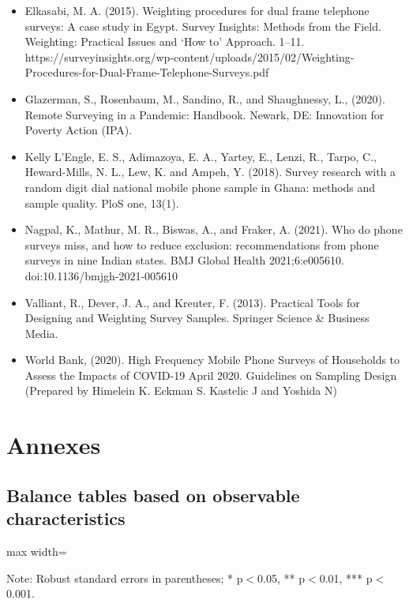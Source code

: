 \documentclass[11pt,harvard]{article}
\begin{document}
\begin{itemize}[left=2.75em]
	\item Elkasabi, M. A. (2015). Weighting procedures for dual frame telephone surveys: A case study in Egypt. Survey Insights: Methods from the Field. Weighting: Practical Issues and ‘How to’ Approach. 1–11. https://surveyinsights.org/wp-content/uploads/2015/02/Weighting-Procedures-for-Dual-Frame-Telephone-Surveys.pdf
	
	\item Glazerman, S., Rosenbaum, M., Sandino, R., and Shaughnessy, L., (2020). Remote Surveying in a Pandemic: Handbook. Newark, DE: Innovation for Poverty Action (IPA).
	
	\item Kelly L’Engle, E. S., Adimazoya, E. A., Yartey, E., Lenzi, R., Tarpo, C., Heward-Mills, N. L., Lew, K. and Ampeh, Y. (2018). Survey research with a random digit dial national mobile phone sample in Ghana: methods and sample quality. PloS one, 13(1).
	
	\item	Nagpal, K., Mathur, M. R., Biswas, A., and Fraker, A. (2021). Who do phone surveys miss, and how to reduce exclusion: recommendations from phone surveys in nine Indian states. BMJ Global Health 2021;6:e005610. doi:10.1136/bmjgh-2021-005610
	
	\item	Valliant, R., Dever, J. A., and Kreuter, F. (2013). Practical Tools for Designing and Weighting Survey Samples. Springer Science \& Business Media.
	
	\item	World Bank, (2020). High Frequency Mobile Phone Surveys of Households to Assess the Impacts of COVID-19 April 2020. Guidelines on Sampling Design (Prepared by Himelein K. Eckman S. Kastelic J and Yoshida N)
\end{itemize}

\pagebreak
\section{Annexes}
\subsection{Balance tables based on observable characteristics}
\begin{table}[htbp]
		\centering
		\begin{adjustbox}{max width=\textwidth}
			\begin{threeparttable}
				\caption{Myanmar Sample Balance Table (completed survey)}
				\scriptsize
				\label{tab:Myanmar_Modality_Demo_Balance}
				\begin{tablenotes}
					\item Note: Robust standard errors in parentheses; * p$<$0.05, ** p$<$0.01, *** p$<$0.001. 
				\end{tablenotes}
			\end{threeparttable}
		\end{adjustbox}
\end{table}
	
\end{document}

